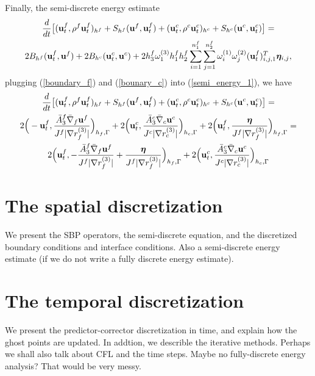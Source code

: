 \documentclass[a4paper]{article}
\begin{document}
Finally, the semi-discrete energy estimate
\begin{multline}\label{semi_energy_1}
\frac{d}{dt}\big[({\bf u}_t^f,\rho^f {\bf u}_t^f)_{h^f} + S_{h^f}({\bf u}^f,{\bf u}^f_t) + ({\bf u}_t^c,\rho^c {\bf u}_t^c)_{h^c} + S_{h^c}({\bf u}^c,{\bf u}^c_t) \big]  = \\
2B_{h^f}({\bf u}_t^f,{\bf u}^f) + 2B_{h^c}({\bf u}_t^c,{\bf u}^c) + 2h_3^f\omega_1^{(3)}h_1^f h_2^f\sum_{i=1}^{n_1^f}\sum_{j=1}^{n_2^f}\omega_i^{(1)}\omega_j^{(2)}({\bf u}_t^f)^T_{i,j,1}{\bm \eta}_{i,j},
\end{multline}
plugging (\ref{boundary_f}) and (\ref{bounary_c}) into (\ref{semi_energy_1}), we have
\begin{multline}\label{semi_energy_2}
\frac{d}{dt}\big[({\bf u}_t^f,\rho^f {\bf u}_t^f)_{h^f} + S_{h^f}({\bf u}^f,{\bf u}^f_t) + ({\bf u}_t^c,\rho^c {\bf u}_t^c)_{h^c} + S_{h^c}({\bf u}^c,{\bf u}^c_t) \big]  = \\
2\Big(-{\bf u}_t^f,\frac{\bar{A}_3^f\bar{\nabla}_f{\bf u}^f}{J^f|\nabla r_f^{(3)}|}\Big)_{h_f,\Gamma} + 2\Big({\bf u}_t^c,\frac{\bar{A}_3^c\bar{\nabla}_c{\bf u}^c}{J^c|\nabla r_c^{(3)}|}\Big)_{h_c,\Gamma} + 2\Big({\bf u}_t^f,\frac{{\bm \eta}}{J^f|\nabla r_f^{(3)}|}\Big)_{h_f,\Gamma} = \\
2\Big({\bf u}_t^f,-\frac{\bar{A}_3^f\bar{\nabla}_f{\bf u}^f}{J^f|\nabla r_f^{(3)}|} + \frac{{\bm \eta}}{J^f|\nabla r_f^{(3)}|}\Big)_{h_f,\Gamma} +  2\Big({\bf u}_t^c,\frac{\bar{A}_3^c\bar{\nabla}_c{\bf u}^c}{J^c|\nabla r_c^{(3)}|}\Big)_{h_c,\Gamma} 
\end{multline}


\section{The spatial discretization}
We present the SBP operators, the semi-discrete equation, and the discretized boundary conditions and interface conditions. Also a semi-discrete energy estimate (if we do not write a fully discrete energy estimate).

\section{The temporal discretization}
We present the predictor-corrector discretization in time, and explain how the ghost points are updated. In addtion, we describle the iterative methods. Perhaps we shall also talk about CFL and the time steps. Maybe no fully-discrete energy analysis? That would be very messy. 
\end{document}
